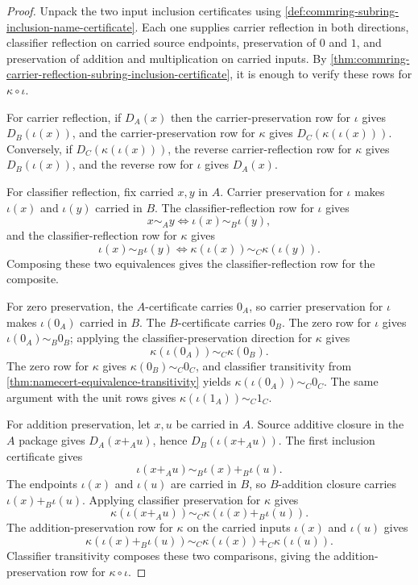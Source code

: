 \begin{proof}
Unpack the two input inclusion certificates using \autoref{def:commring-subring-inclusion-name-certificate}. Each one supplies carrier reflection in both directions, classifier reflection on carried source endpoints, preservation of $0$ and $1$, and preservation of addition and multiplication on carried inputs. By \autoref{thm:commring-carrier-reflection-subring-inclusion-certificate}, it is enough to verify these rows for $\kappa\circ\iota$.

For carrier reflection, if $D_A(x)$ then the carrier-preservation row for $\iota$ gives $D_B(\iota(x))$, and the carrier-preservation row for $\kappa$ gives $D_C(\kappa(\iota(x)))$. Conversely, if $D_C(\kappa(\iota(x)))$, the reverse carrier-reflection row for $\kappa$ gives $D_B(\iota(x))$, and the reverse row for $\iota$ gives $D_A(x)$.

For classifier reflection, fix carried $x,y$ in $A$. Carrier preservation for $\iota$ makes $\iota(x)$ and $\iota(y)$ carried in $B$. The classifier-reflection row for $\iota$ gives
$$
x\sim_A y\Longleftrightarrow \iota(x)\sim_B\iota(y),
$$
and the classifier-reflection row for $\kappa$ gives
$$
\iota(x)\sim_B\iota(y)\Longleftrightarrow \kappa(\iota(x))\sim_C\kappa(\iota(y)).
$$
Composing these two equivalences gives the classifier-reflection row for the composite.

For zero preservation, the $A$-certificate carries $0_A$, so carrier preservation for $\iota$ makes $\iota(0_A)$ carried in $B$. The $B$-certificate carries $0_B$. The zero row for $\iota$ gives $\iota(0_A)\sim_B0_B$; applying the classifier-preservation direction for $\kappa$ gives
$$
\kappa(\iota(0_A))\sim_C\kappa(0_B).
$$
The zero row for $\kappa$ gives $\kappa(0_B)\sim_C0_C$, and classifier transitivity from \autoref{thm:namecert-equivalence-transitivity} yields $\kappa(\iota(0_A))\sim_C0_C$. The same argument with the unit rows gives $\kappa(\iota(1_A))\sim_C1_C$.

For addition preservation, let $x,u$ be carried in $A$. Source additive closure in the $A$ package gives $D_A(x+_Au)$, hence $D_B(\iota(x+_Au))$. The first inclusion certificate gives
$$
\iota(x+_Au)\sim_B\iota(x)+_B\iota(u).
$$
The endpoints $\iota(x)$ and $\iota(u)$ are carried in $B$, so $B$-addition closure carries $\iota(x)+_B\iota(u)$. Applying classifier preservation for $\kappa$ gives
$$
\kappa(\iota(x+_Au))\sim_C\kappa(\iota(x)+_B\iota(u)).
$$
The addition-preservation row for $\kappa$ on the carried inputs $\iota(x)$ and $\iota(u)$ gives
$$
\kappa(\iota(x)+_B\iota(u))\sim_C\kappa(\iota(x))+_C\kappa(\iota(u)).
$$
Classifier transitivity composes these two comparisons, giving the addition-preservation row for $\kappa\circ\iota$.


\end{proof}
